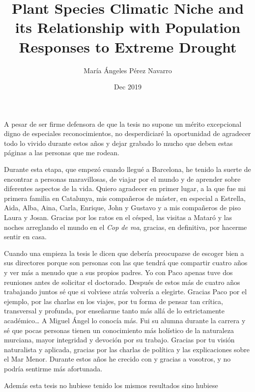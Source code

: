 \documentclass[11pt,twoside]{reedthesis}
\title{Plant Species Climatic Niche and its Relationship with Population
Responses to Extreme Drought}
\author{María Ángeles Pérez Navarro}
\date{Dec 2019}
\begin{document}
  \maketitle

\frontmatter %
\pagestyle{empty} %
  \begin{acknowledgements}
    \setlength{\parindent}{30pt} A pesar de ser firme defensora de que la
    tesis no supone un mérito excepcional digno de especiales
    reconocimientos, no desperdiciaré la oportunidad de agradecer todo lo
    vivido durante estos años y dejar grabado lo mucho que deben estas
    páginas a las personas que me rodean.\par
    Durante esta etapa, que empezó cuando llegué a Barcelona, he tenido la
    suerte de encontrar a personas maravillosas, de viajar por el mundo y de
    aprender sobre diferentes aspectos de la vida. Quiero agradecer en
    primer lugar, a la que fue mi primera familia en Catalunya, mis
    compañeros de máster, en especial a Estrella, Aida, Alba, Aina, Carla,
    Enrique, John y Gustavo y a mis compañeros de piso Laura y Josan.
    Gracias por los ratos en el césped, las visitas a Mataró y las noches
    arreglando el mundo en el \emph{Cop de ma}, gracias, en definitiva, por
    hacerme sentir en casa.\par
    Cuando una empieza la tesis le dicen que debería preocuparse de escoger
    bien a sus directores porque son personas con las que tendrá que
    compartir cuatro años y ver más a menudo que a sus propios padres. Yo
    con Paco apenas tuve dos reuniones antes de solicitar el doctorado.
    Después de estos más de cuatro años trabajando juntos sé que si volviese
    atrás volvería a elegirte. Gracias Paco por el ejemplo, por las charlas
    en los viajes, por tu forma de pensar tan crítica, transversal y
    profunda, por enseñarme tanto más allá de lo estrictamente
    académico\ldots{} A Miguel Ángel lo conocía más. Fui su alumna durante
    la carrera y sé que pocas personas tienen un conocimiento más holístico
    de la naturaleza murciana, mayor integridad y devoción por su trabajo.
    Gracias por tu visión naturalista y aplicada, gracias por las charlas de
    política y las explicaciones sobre el Mar Menor. Durante estos años he
    crecido con y gracias a vosotros, y no podría sentirme más
    afortunada.\par
    Además esta tesis no hubiese tenido los mismos resultados sino hubiese

\end{acknowledgements}
\end{document}
